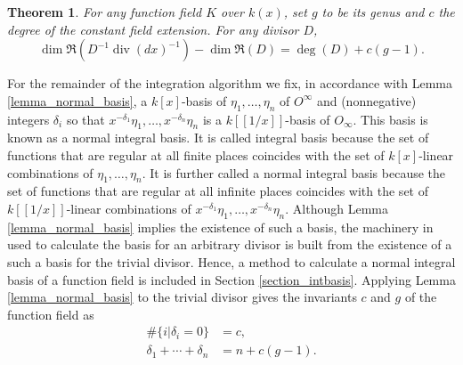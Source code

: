 \documentclass[12pt,reqno]{amsart}
\numberwithin{equation}{section}
\newtheorem{theorem}{Theorem}[section]
\newcommand{\op}[1]  { \operatorname{ #1 }}
\newcommand{\goR}[0]  { \mathfrak{R}}
\begin{document}
\begin{theorem}
\label{thm_rr}
 For any function field $K$ over $k(x)$, set $g$ to be its genus and $c$ the degree of the constant field extension. For any divisor $D$,
\begin{equation*}
\op{dim}\goR(D^{-1} \op{div}(dx)^{-1} ) - \op{dim}\goR(D) = \op{deg}(D) + c (g-1)\text{.}
\end{equation*}
\end{theorem}


For the remainder of the integration algorithm we fix, in accordance with Lemma \ref{lemma_normal_basis}, a $k[x]$-basis of $\eta_1,\dots,\eta_n$ of $O^{\infty}$ and (nonnegative) integers $\delta_i$ so that $x^{-\delta_1}\eta_1,\dots,x^{-\delta_n}\eta_n$ is a $k[[1/x]]$-basis of $O_{\infty}$. This basis is known as a normal integral basis. It is called integral basis because the set of functions that are regular at all finite places coincides with the set of $k[x]$-linear combinations of $\eta_1,\dots,\eta_n$. It is further called a normal integral basis because the set of functions that are regular at all infinite places coincides with the set of $k[[1/x]]$-linear combinations of $x^{-\delta_1}\eta_1,\dots,x^{-\delta_n}\eta_n$. Although Lemma \ref{lemma_normal_basis} implies the existence of such a basis, the machinery in \cite{hess} used to calculate the basis for an arbitrary divisor is built from the existence of a such a basis for the trivial divisor. Hence, a method to calculate a normal integral basis of a function field is included in Section \ref{section_intbasis}. Applying Lemma \ref{lemma_normal_basis} to the trivial divisor gives the invariants $c$ and $g$ of the function field as
\begin{equation}
\label{equ_inv}
\begin{alignedat}{3}
 \#\{i|\delta_i=0\} &= c\text{,}\\
 \delta_1 + \cdots+ \delta_n &= n + c (g-1)\text{.}
\end{alignedat} 
\end{equation}
\end{document}
